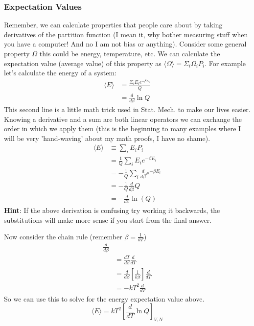 \documentclass{article}
\begin{document}
\subsubsection*{Expectation Values}
Remember, we can calculate properties that people care about by taking derivatives of the partition function (I mean it, why bother measuring stuff when you have a computer! And no I am not bias or anything). 
Consider some general property $\Omega$ this could be energy, temperature, etc. 
We can calculate the expectation value (average value) of this property as $\langle \Omega \rangle = \Sigma_i \Omega_i P_i$. 
For example let's calculate the energy of a system:
\begin{equation}
\begin{split}
\langle E \rangle &= \frac{\Sigma_i E_i e^{-\beta E_i}}{Q} \\ 
&= \frac{d}{d\beta} \ln Q
\end{split}
\end{equation}
This second line is a little math trick used in Stat. Mech. to make our lives easier.
Knowing a derivative and a sum are both linear operators we can exchange the order in which we apply them (this is the beginning to many examples where I will be very 'hand-waving' about my math proofs, I have no shame). 
\begin{equation}
\begin{split}
    \langle E \rangle &\equiv \sum_i E_i P_i\\
    &= \frac{1}{Q}\sum_i E_ie^{-\beta E_i}\\
    &= -\frac{1}{Q}\sum_i\frac{d}{d\beta}e^{-\beta E_i} \\
    &= -\frac{1}{Q}\frac{d}{d\beta}Q\\
    &= -\frac{d}{d\beta} \ln(Q)
\end{split}
\end{equation}
\textbf{Hint}: If the above derivation is confusing try working it backwards, the substitutions will make more sense if you start from the final answer. 

Now consider the chain rule (remember $\beta = \frac{1}{kT}$)
\begin{equation}
\begin{split}
\frac{d}{d\beta} & \\
&= \frac{dT}{d\beta}\frac{d}{dT} \\
&= \frac{d}{d\beta}\left [ \frac{1}{k\beta} \right ]\frac{d}{dT}\\
&= -kT^2\frac{d}{dT}
\end{split}
\end{equation}
So we can use this to solve for the energy expectation value above.
\begin{equation}
\langle E \rangle = kT^2 \left [\frac{d}{dT} \ln Q\right ]_{V,N}
\end{equation}
\end{document}
